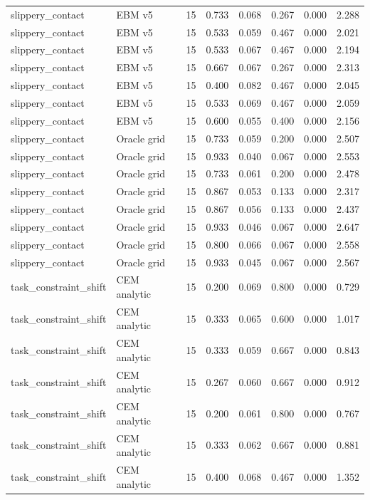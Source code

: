 {\begin{longtable}{llrrrrrr}
slippery\_contact & EBM v5 & 15 & 0.733 & 0.068 & 0.267 & 0.000 & 2.288 \\
slippery\_contact & EBM v5 & 15 & 0.533 & 0.059 & 0.467 & 0.000 & 2.021 \\
slippery\_contact & EBM v5 & 15 & 0.533 & 0.067 & 0.467 & 0.000 & 2.194 \\
slippery\_contact & EBM v5 & 15 & 0.667 & 0.067 & 0.267 & 0.000 & 2.313 \\
slippery\_contact & EBM v5 & 15 & 0.400 & 0.082 & 0.467 & 0.000 & 2.045 \\
slippery\_contact & EBM v5 & 15 & 0.533 & 0.069 & 0.467 & 0.000 & 2.059 \\
slippery\_contact & EBM v5 & 15 & 0.600 & 0.055 & 0.400 & 0.000 & 2.156 \\
slippery\_contact & Oracle grid & 15 & 0.733 & 0.059 & 0.200 & 0.000 & 2.507 \\
slippery\_contact & Oracle grid & 15 & 0.933 & 0.040 & 0.067 & 0.000 & 2.553 \\
slippery\_contact & Oracle grid & 15 & 0.733 & 0.061 & 0.200 & 0.000 & 2.478 \\
slippery\_contact & Oracle grid & 15 & 0.867 & 0.053 & 0.133 & 0.000 & 2.317 \\
slippery\_contact & Oracle grid & 15 & 0.867 & 0.056 & 0.133 & 0.000 & 2.437 \\
slippery\_contact & Oracle grid & 15 & 0.933 & 0.046 & 0.067 & 0.000 & 2.647 \\
slippery\_contact & Oracle grid & 15 & 0.800 & 0.066 & 0.067 & 0.000 & 2.558 \\
slippery\_contact & Oracle grid & 15 & 0.933 & 0.045 & 0.067 & 0.000 & 2.567 \\
task\_constraint\_shift & CEM analytic & 15 & 0.200 & 0.069 & 0.800 & 0.000 & 0.729 \\
task\_constraint\_shift & CEM analytic & 15 & 0.333 & 0.065 & 0.600 & 0.000 & 1.017 \\
task\_constraint\_shift & CEM analytic & 15 & 0.333 & 0.059 & 0.667 & 0.000 & 0.843 \\
task\_constraint\_shift & CEM analytic & 15 & 0.267 & 0.060 & 0.667 & 0.000 & 0.912 \\
task\_constraint\_shift & CEM analytic & 15 & 0.200 & 0.061 & 0.800 & 0.000 & 0.767 \\
task\_constraint\_shift & CEM analytic & 15 & 0.333 & 0.062 & 0.667 & 0.000 & 0.881 \\
task\_constraint\_shift & CEM analytic & 15 & 0.400 & 0.068 & 0.467 & 0.000 & 1.352 \\

\end{longtable}}

